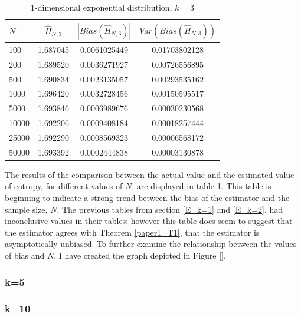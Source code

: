 \documentclass{article}
\begin{document}
\begin{table}
\caption{1-dimensional exponential distribution, $k=3$} \label{expo_k=3_table}
\begin{center}
\begin{tabular}{| l | c c c|} 
\toprule
$N$ & $\hat{H}_{N, 3}$ & $|Bias(\hat{H}_{N, 3})|$ & $Var(Bias(\hat{H}_{N, 3}))$ \\
\midrule[1pt]
100     & 1.687045     & 0.0061025449     & 0.01703802128  \\
200     & 1.689520     & 0.0036271927     & 0.00726556895  \\
500     & 1.690834     & 0.0023135057     & 0.00293535162  \\
1000    & 1.696420     & 0.0032728456     & 0.00150595517  \\
5000    & 1.693846     & 0.0006989676     & 0.00030230568  \\
10000   & 1.692206     & 0.0009408184     & 0.00018257444  \\
25000   & 1.692290     & 0.0008569323     & 0.00006568172  \\
50000   & 1.693392     & 0.0002444838     & 0.00003130878  \\
\hline
\end{tabular}
\end{center}
\end{table}

The results of the comparison between the actual value and the estimated value of entropy, for different values of $N$, are displayed in table \ref{expo_k=3_table}. This table is beginning to indicate a strong trend between the bias of the estimator and the sample size, $N$. The previous tables from section \ref{E_k=1} and \ref{E_k=2}, had inconclusive values in their tables; however this table does seem to suggest that the estimator agrees with Theorem \ref{paper1_T1}, that the estimator is asymptotically unbiased. To further examine the relationship between the values of bias and $N$, I have created the graph depicted in Figure \ref{}.





\subsubsection{k=5} \label{E_k=5}

\subsubsection{k=10} \label{E_k=10}
\end{document}
